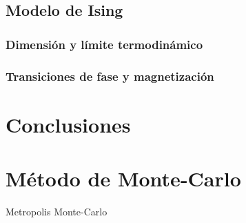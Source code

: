 \documentclass[11pt, a4paper]{article} %
\theoremstyle{named}
\begin{document}
    \newpage
    \subsection{Modelo de Ising}\label{sec:ising}

        \subsubsection{Dimensión y límite termodinámico}\label{sec:lt}

        \subsubsection{Transiciones de fase y magnetización}\label{sec:transiciones}

\newpage
\section{Conclusiones}\label{sec:conclusiones}

\newpage
\appendix
\section{Método de Monte-Carlo}\label{sec:app-MC}

    Metropolis Monte-Carlo

\nocite{einstein}
\nocite{max}



\end{document}
